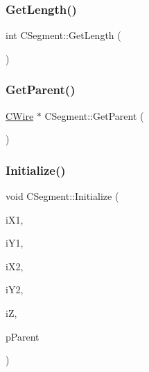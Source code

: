 \mbox{\label{classCSegment_a3e3b6bee56494e679a5e6815dae3a9eb}} 
\subsubsection{\texorpdfstring{GetLength()}{GetLength()}}
{\footnotesize\ttfamily int C\+Segment\+::\+Get\+Length (\begin{DoxyParamCaption}{ }\end{DoxyParamCaption})}

\mbox{\label{classCSegment_a2337630eb7eff85f043a14c41dab7ddb}} 
\subsubsection{\texorpdfstring{GetParent()}{GetParent()}}
{\footnotesize\ttfamily \mbox{\hyperlink{classCWire}{C\+Wire}} $\ast$ C\+Segment\+::\+Get\+Parent (\begin{DoxyParamCaption}{ }\end{DoxyParamCaption})}

\mbox{\label{classCSegment_a4169ed50ec196a0f1bf4d5d458f2c15d}} 
\subsubsection{\texorpdfstring{Initialize()}{Initialize()}\hspace{0.1cm}{\footnotesize\ttfamily [1/3]}}
{\footnotesize\ttfamily void C\+Segment\+::\+Initialize (\begin{DoxyParamCaption}\item[{int}]{i\+X1,  }\item[{int}]{i\+Y1,  }\item[{int}]{i\+X2,  }\item[{int}]{i\+Y2,  }\item[{int}]{iZ,  }\item[{\mbox{\hyperlink{classCWire}{C\+Wire}} $\ast$}]{p\+Parent }\end{DoxyParamCaption})}

\mbox{\label{classCSegment_aaecb99cf5cb003782674c788b4af4f91}} 
